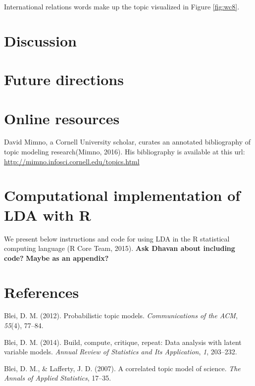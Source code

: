 \documentclass[12pt,]{article}
\begin{document}
International relations words make up the topic visualized in Figure
\ref{fig:wc8}.

\section{Discussion}\label{discussion}

\section{Future directions}\label{future-directions}

\section{Online resources}\label{online-resources}

David Mimno, a Cornell University scholar, curates an annotated
bibliography of topic modeling research(Mimno, 2016). His bibliography
is available at this url:
\url{http://mimno.infosci.cornell.edu/topics.html}

\section{Computational implementation of LDA with
R}\label{computational-implementation-of-lda-with-r}

We present below instructions and code for using LDA in the R
statistical computing language (R Core Team, 2015). \textbf{Ask Dhavan
about including code?} \textbf{Maybe as an appendix?}

\section*{References}\label{references}

\hypertarget{refs}{}
\hypertarget{ref-blei2012probabilistic}{}
Blei, D. M. (2012). Probabilistic topic models. \emph{Communications of
the ACM}, \emph{55}(4), 77--84.

\hypertarget{ref-blei2014build}{}
Blei, D. M. (2014). Build, compute, critique, repeat: Data analysis with
latent variable models. \emph{Annual Review of Statistics and Its
Application}, \emph{1}, 203--232.

\hypertarget{ref-blei2007correlated}{}
Blei, D. M., \& Lafferty, J. D. (2007). A correlated topic model of
science. \emph{The Annals of Applied Statistics}, 17--35.
\end{document}
